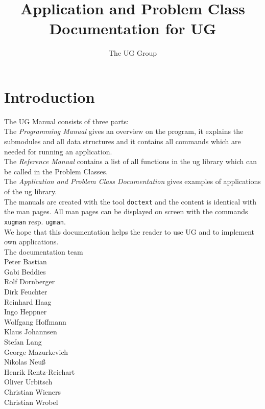



\pagestyle{myheadings}
\sloppy
\makeindex




\newcommand{\sectitle}{\mbox{}}
\setcounter{page}{0}

\title{Application and Problem Class Documentation for UG}
\author{The UG Group}

\maketitle


\section*{Introduction}

The UG Manual consists of three parts:
\\[5mm]  
The {\em Programming Manual} gives an overview on the program, it
explains the submodules and all data structures and it contains
all commands which are needed for running an application.
\\[5mm]  
The {\em Reference Manual} contains a list of all 
functions in the ug library which can be called in the Problem Classes.
\\[5mm]
The {\em Application and Problem Class Documentation} gives examples
of applications of the ug library.
\\[5mm]
The manuals are created with the tool {\tt doctext} and the content is 
identical with the man pages. All man pages can be displayed on screen 
with the commands {\tt xugman} resp. {\tt ugman}.
\\[5mm]
We hope that this documentation helps the reader to use UG 
and to implement own applications.
\\[1cm]
The documentation team
\\[1cm]
Peter Bastian\\
Gabi Beddies\\
Rolf Dornberger\\
Dirk Feuchter\\
Reinhard Haag\\
Ingo Heppner\\
Wolfgang Hoffmann\\
Klaus Johannsen\\
Stefan Lang\\
George Mazurkevich\\
Nikolas Neu\ss\\
Henrik Rentz-Reichart\\
Oliver Urbitsch\\
Christian Wieners\\
Christian Wrobel


